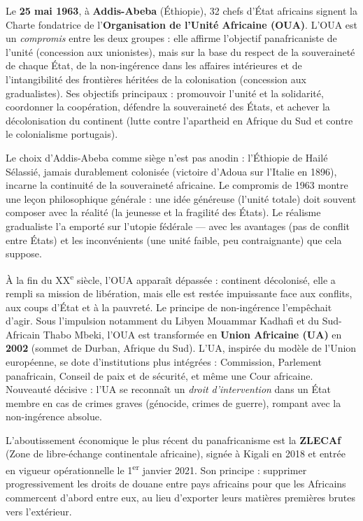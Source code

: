 \documentclass[11pt]{article}
\newcounter{popsec}
\newcounter{popsub}
\newcommand{\courssub}[1]{%
  \stepcounter{popsub}%
  \par\vspace{9pt}\noindent{\popxbold\fontsize{11.5}{13}\selectfont\color{popink}{\color{poporange}\thepopsec.\thepopsub}\hspace{6pt}#1}\par\nopagebreak\vspace{4pt}
}
\begin{document}
Le \textbf{25 mai 1963}, à \textbf{Addis-Abeba} (Éthiopie), 32 chefs d'État africains signent la Charte fondatrice de l'\textbf{Organisation de l'Unité Africaine (OUA)}. L'OUA est un \emph{compromis} entre les deux groupes : elle affirme l'objectif panafricaniste de l'unité (concession aux unionistes), mais sur la base du respect de la souveraineté de chaque État, de la non-ingérence dans les affaires intérieures et de l'intangibilité des frontières héritées de la colonisation (concession aux gradualistes). Ses objectifs principaux : promouvoir l'unité et la solidarité, coordonner la coopération, défendre la souveraineté des États, et achever la décolonisation du continent (lutte contre l'apartheid en Afrique du Sud et contre le colonialisme portugais).

\begin{exemplebox}
Le choix d'Addis-Abeba comme siège n'est pas anodin : l'Éthiopie de Hailé Sélassié, jamais durablement colonisée (victoire d'Adoua sur l'Italie en 1896), incarne la continuité de la souveraineté africaine. Le compromis de 1963 montre une leçon philosophique générale : une idée généreuse (l'unité totale) doit souvent composer avec la réalité (la jeunesse et la fragilité des États). Le réalisme gradualiste l'a emporté sur l'utopie fédérale — avec les avantages (pas de conflit entre États) et les inconvénients (une unité faible, peu contraignante) que cela suppose.
\end{exemplebox}

\courssub{et après : de l'OUA à l'Union Africaine et à la ZLECAf}

À la fin du XX\textsuperscript{e} siècle, l'OUA apparaît dépassée : continent décolonisé, elle a rempli sa mission de libération, mais elle est restée impuissante face aux conflits, aux coups d'État et à la pauvreté. Le principe de non-ingérence l'empêchait d'agir. Sous l'impulsion notamment du Libyen Mouammar Kadhafi et du Sud-Africain Thabo Mbeki, l'OUA est transformée en \textbf{Union Africaine (UA)} en \textbf{2002} (sommet de Durban, Afrique du Sud). L'UA, inspirée du modèle de l'Union européenne, se dote d'institutions plus intégrées : Commission, Parlement panafricain, Conseil de paix et de sécurité, et même une Cour africaine. Nouveauté décisive : l'UA se reconnaît un \emph{droit d'intervention} dans un État membre en cas de crimes graves (génocide, crimes de guerre), rompant avec la non-ingérence absolue.

L'aboutissement économique le plus récent du panafricanisme est la \textbf{ZLECAf} (Zone de libre-échange continentale africaine), signée à Kigali en 2018 et entrée en vigueur opérationnelle le 1\textsuperscript{er} janvier 2021. Son principe : supprimer progressivement les droits de douane entre pays africains pour que les Africains commercent d'abord entre eux, au lieu d'exporter leurs matières premières brutes vers l'extérieur.
\end{document}
